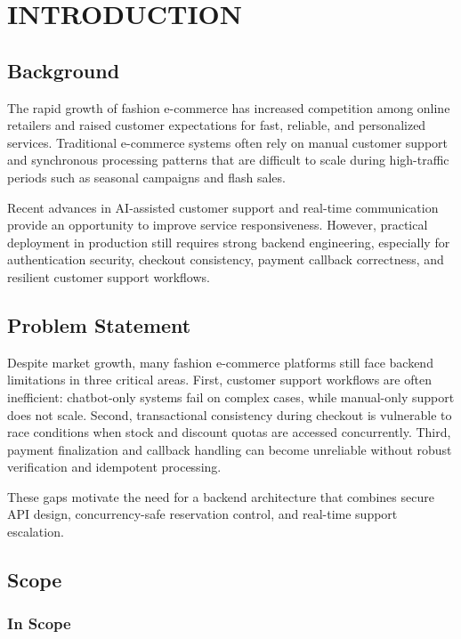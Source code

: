 ﻿\chapter{INTRODUCTION}
\label{ch:introduction}

\section{Background}

The rapid growth of fashion e-commerce has increased competition among online retailers and raised customer expectations for fast, reliable, and personalized services. Traditional e-commerce systems often rely on manual customer support and synchronous processing patterns that are difficult to scale during high-traffic periods such as seasonal campaigns and flash sales.

Recent advances in AI-assisted customer support and real-time communication provide an opportunity to improve service responsiveness. However, practical deployment in production still requires strong backend engineering, especially for authentication security, checkout consistency, payment callback correctness, and resilient customer support workflows.

\section{Problem Statement}

Despite market growth, many fashion e-commerce platforms still face backend limitations in three critical areas. First, customer support workflows are often inefficient: chatbot-only systems fail on complex cases, while manual-only support does not scale. Second, transactional consistency during checkout is vulnerable to race conditions when stock and discount quotas are accessed concurrently. Third, payment finalization and callback handling can become unreliable without robust verification and idempotent processing.

These gaps motivate the need for a backend architecture that combines secure API design, concurrency-safe reservation control, and real-time support escalation.

\section{Scope}

\subsection{In Scope}

